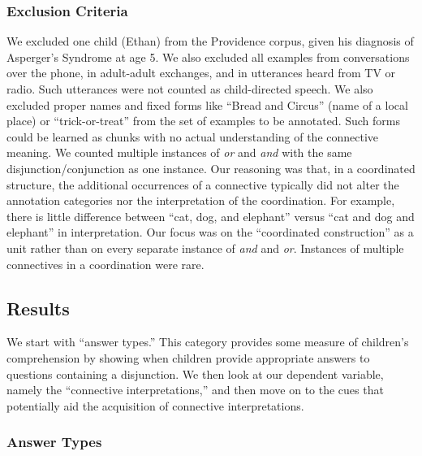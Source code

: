 \documentclass[
  english,
  ,man,floatsintext]{apa6}
\begin{document}
\hypertarget{exclusion-criteria-1}{%
\subsubsection{Exclusion Criteria}\label{exclusion-criteria-1}}

We excluded one child (Ethan) from the Providence corpus, given his diagnosis of Asperger's Syndrome at age 5. We also excluded all examples from conversations over the phone, in adult-adult exchanges, and in utterances heard from TV or radio. Such utterances were not counted as child-directed speech. We also excluded proper names and fixed forms like ``Bread and Circus'' (name of a local place) or ``trick-or-treat'' from the set of examples to be annotated. Such forms could be learned as chunks with no actual understanding of the connective meaning. We counted multiple instances of \emph{or} and \emph{and} with the same disjunction/conjunction as one instance. Our reasoning was that, in a coordinated structure, the additional occurrences of a connective typically did not alter the annotation categories nor the interpretation of the coordination. For example, there is little difference between ``cat, dog, and elephant'' versus ``cat and dog and elephant'' in interpretation. Our focus was on the ``coordinated construction'' as a unit rather than on every separate instance of \emph{and} and \emph{or}. Instances of multiple connectives in a coordination were rare.

\hypertarget{results}{%
\subsection{Results}\label{results}}

We start with ``answer types.'' This category provides some measure of children's comprehension by showing when children provide appropriate answers to questions containing a disjunction. We then look at our dependent variable, namely the ``connective interpretations,'' and then move on to the cues that potentially aid the acquisition of connective interpretations.

\hypertarget{answer-types}{%
\subsubsection{Answer Types}\label{answer-types}}
\end{document}
